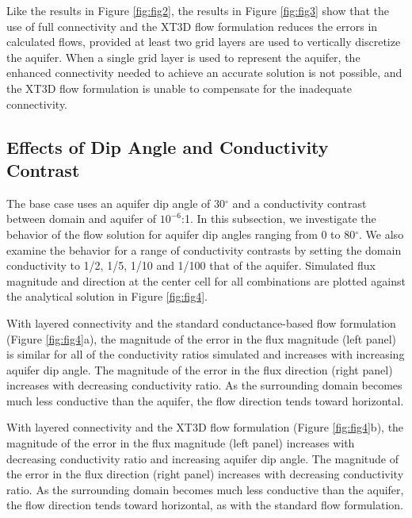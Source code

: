 \documentclass{article}
\begin{document}
Like the results in Figure \ref{fig:fig2}, the results in Figure \ref{fig:fig3} show that the use of full connectivity and the XT3D flow formulation reduces the errors in calculated flows, provided at least two grid layers are used to vertically discretize the aquifer. When a single grid layer is used to represent the aquifer, the enhanced connectivity needed to achieve an accurate solution is not possible, and the XT3D flow formulation is unable to compensate for the inadequate connectivity.

\subsection{Effects of Dip Angle and Conductivity Contrast}

The base case uses an aquifer dip angle of 30$^{\circ}$ and a conductivity contrast between domain and aquifer of $10^{-6}$:1. In this subsection, we investigate the behavior of the flow solution for aquifer dip angles ranging from 0 to 80$^{\circ}$. We also examine the behavior for a range of conductivity contrasts by setting the domain conductivity to 1/2, 1/5, 1/10 and 1/100 that of the aquifer. Simulated flux magnitude and direction at the center cell for all combinations are plotted against the analytical solution in Figure \ref{fig:fig4}. 

With layered connectivity and the standard conductance-based flow formulation (Figure \ref{fig:fig4}a), the magnitude of the error in the flux magnitude (left panel) is similar for all of the conductivity ratios simulated and increases with increasing aquifer dip angle. The magnitude of the error in the flux direction (right panel) increases with decreasing conductivity ratio. As the surrounding domain becomes much less conductive than the aquifer, the flow direction tends toward horizontal.

With layered connectivity and the XT3D flow formulation (Figure \ref{fig:fig4}b), the magnitude of the error in the flux magnitude (left panel) increases with decreasing conductivity ratio and increasing aquifer dip angle. The magnitude of the error in the flux direction (right panel) increases with decreasing conductivity ratio. As the surrounding domain becomes much less conductive than the aquifer, the flow direction tends toward horizontal, as with the standard flow formulation.
\end{document}
